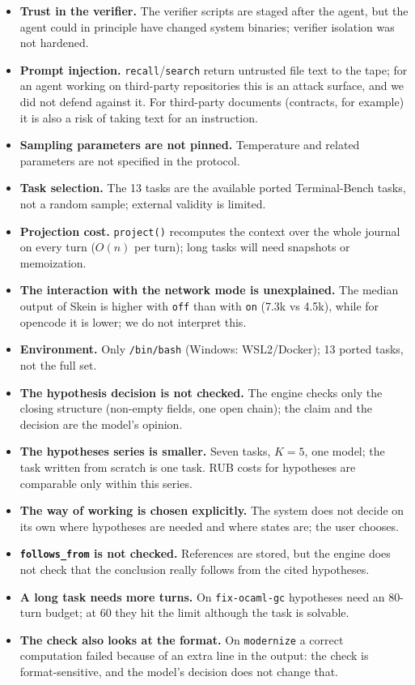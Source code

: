 \documentclass[11pt,a4paper]{article}
\begin{document}
\begin{itemize}[leftmargin=1.4em,itemsep=0.2em]
  label).
  \item \textbf{Trust in the verifier.} The verifier scripts are staged after the agent, but the
  agent could in principle have changed system binaries; verifier isolation was not hardened.
  \item \textbf{Prompt injection.} \texttt{recall}/\texttt{search} return untrusted file text to
  the tape; for an agent working on third-party repositories this is an attack surface, and we
  did not defend against it. For third-party documents (contracts, for example) it is also a risk
  of taking text for an instruction.
  \item \textbf{Sampling parameters are not pinned.} Temperature and related parameters are not
  specified in the protocol.
  \item \textbf{Task selection.} The 13 tasks are the available ported Terminal-Bench tasks, not
  a random sample; external validity is limited.
  \item \textbf{Projection cost.} \texttt{project()} recomputes the context over the whole
  journal on every turn ($O(n)$ per turn); long tasks will need snapshots or memoization.
  \item \textbf{The interaction with the network mode is unexplained.} The median output of
  Skein is higher with \texttt{off} than with \texttt{on} (7.3k vs 4.5k), while for opencode it
  is lower; we do not interpret this.
  \item \textbf{Environment.} Only \texttt{/bin/bash} (Windows: WSL2/Docker); 13 ported tasks,
  not the full set.
  \item \textbf{The hypothesis decision is not checked.} The engine checks only the closing
  structure (non-empty fields, one open chain); the claim and the decision are the model's opinion.
  \item \textbf{The hypotheses series is smaller.} Seven tasks, $K=5$, one model; the task written
  from scratch is one task. RUB costs for hypotheses are comparable only within this series.
  \item \textbf{The way of working is chosen explicitly.} The system does not decide on its own
  where hypotheses are needed and where states are; the user chooses.
  \item \textbf{\texttt{follows\_from} is not checked.} References are stored, but the engine does
  not check that the conclusion really follows from the cited hypotheses.
  \item \textbf{A long task needs more turns.} On \texttt{fix-ocaml-gc} hypotheses need an 80-turn
  budget; at 60 they hit the limit although the task is solvable.
  \item \textbf{The check also looks at the format.} On \texttt{modernize} a correct computation
  failed because of an extra line in the output: the check is format-sensitive, and the model's
  decision does not change that.
\end{itemize}
\end{document}
